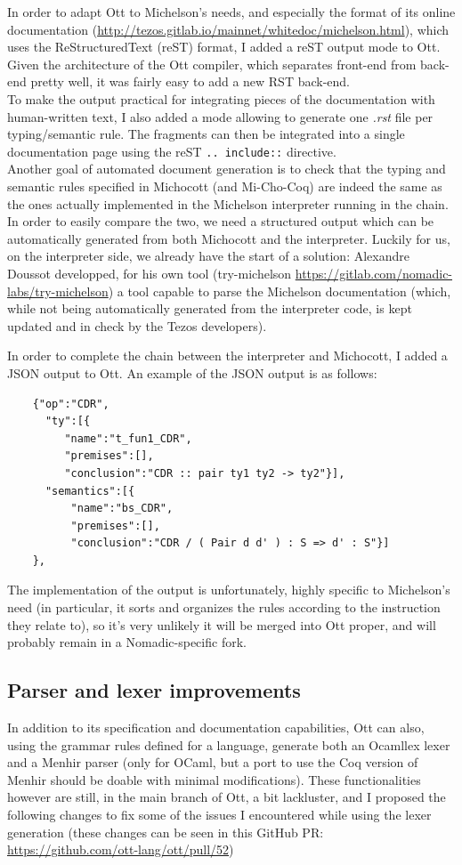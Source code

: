 \documentclass{report}
\begin{document}
In order to adapt Ott to Michelson's needs, and especially the format of its online documentation (\url{http://tezos.gitlab.io/mainnet/whitedoc/michelson.html}), which uses the ReStructuredText (reST) format, I added a reST output mode to Ott. Given the architecture of the Ott compiler, which separates front-end from back-end pretty well, it was fairly easy to add a new RST back-end.\\
To make the output practical for integrating pieces of the documentation with human-written text, I also added a mode allowing to generate one \textit{.rst} file per typing/semantic rule. The fragments can then be integrated into a single documentation page using the reST \texttt{.. include::} directive.\\

Another goal of automated document generation is to check that the typing and semantic rules specified in Michocott (and Mi-Cho-Coq) are indeed the same as the ones actually implemented in the Michelson interpreter running in the chain. In order to easily compare the two, we need a structured output which can be automatically generated from both Michocott and the interpreter. Luckily for us, on the interpreter side, we already have the start of a solution: Alexandre Doussot developped, for his own tool (try-michelson \url{https://gitlab.com/nomadic-labs/try-michelson}) a tool capable to parse the Michelson documentation (which, while not being automatically generated from the interpreter code, is kept updated and in check by the Tezos developers).

In order to complete the chain between the interpreter and Michocott, I added a JSON output to Ott. An example of the JSON output is as follows:
\begin{verbatim}
    {"op":"CDR",
      "ty":[{
         "name":"t_fun1_CDR",
         "premises":[],
         "conclusion":"CDR :: pair ty1 ty2 -> ty2"}],
      "semantics":[{
          "name":"bs_CDR",
          "premises":[],
          "conclusion":"CDR / ( Pair d d' ) : S => d' : S"}]
    },
\end{verbatim}
The implementation of the output is unfortunately, highly specific to Michelson's need (in particular, it sorts and organizes the rules according to the instruction they relate to), so it's very unlikely it will be merged into Ott proper, and will probably remain in a Nomadic-specific fork.

\subsection{Parser and lexer improvements}
\label{parserLexerImprov}
In addition to its specification and documentation capabilities, Ott can also, using the grammar rules defined for a language, generate both an Ocamllex lexer and a Menhir parser (only for OCaml, but a port to use the Coq version of Menhir should be doable with minimal modifications). These functionalities however are still, in the main branch of Ott, a bit lackluster, and I proposed the following changes to fix some of the issues I encountered while using the lexer generation (these changes can be seen in this GitHub PR: \url{https://github.com/ott-lang/ott/pull/52})
\end{document}
